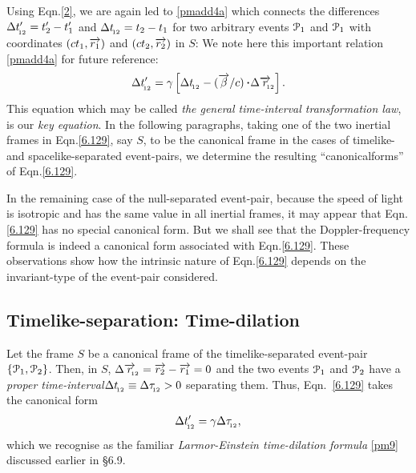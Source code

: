 Using Eqn.\eqref{2}, we are again led to 
\eqref{pmadd4a} 
which connects the differences $\Delta 
t'_{_{\hspace*{-1.5pt}{12}}}=t'_2-t'_1$  and $\Delta 
t_{_{\hspace*{-1.5pt}{12}}}=t_2-t_1$ for two arbitrary events 
$\EuScript{P}_1$ and $\EuScript{P}_1$ with coordinates 
$(ct_1,\overrightarrow{r_1})$ and $(ct_2,\overrightarrow{r_2})$ in $S$: We 
note 
here this important relation \eqref{pmadd4a} for 
future 
reference:
\begin{align} \label{6.129}
\Delta t'_\sfx{12}  =\gkg \left[\Delta
t_\sfx{12}-(\veca{\gkb}/c)\, \dotp\Delta
\veca{r}_\sfx{\nnt 12}\right].
\end{align}
This equation which may be called \textsl{the general  
time-interval transformation law}, is our \textsl{key 
equation}. In the following paragraphs, taking one of 
the 
two inertial frames in Eqn.\eqref{6.129}, say $S$, to 
be 
the 
canonical frame in the cases of timelike- and 
spacelike-separated event-pairs, we determine the 
resulting 
``canonical\break forms'' of  Eqn.\eqref{6.129}. 

In the remaining case of the null-separated 
event-pair, 
because the speed of light is isotropic and has the 
same 
value in all inertial frames, it may appear that  
Eqn.\eqref{6.129} has no special canonical form. But 
we 
shall 
see that the Doppler-frequency formula is indeed a  
canonical form associated with Eqn.\eqref{6.129}. 
These 
observations show how the intrinsic nature of  
Eqn.\eqref{6.129} 
depends on the invariant-type of the event-pair 
considered.

\subsection{Timelike-separation: Time-dilation}
Let the frame $S$ be a canonical frame of the 
timelike-separated event-pair $\{\EuScript{P}_1, 
\EuScript{P}_2 \}$. Then, in $S$, $\Delta 
\overrightarrow{r}_{_{\hspace*{-1.5pt}{\negthinspace\negthinspace 
12}}} = \overrightarrow{r_2}-\overrightarrow{r_1}=0$ and the two events 
$\EuScript{P}_1$  and $\EuScript{P}_2$ have a 
\textsl{proper 
time-interval}$ \Delta t_{_{\hspace*{-1.5pt}{12}}} \equiv \Delta 
\tau_{_{\hspace*{-1.5pt}{12}}} >0 $ separating them. Thus,  
Eqn.~\eqref{6.129} 
takes the canonical form \begin{align}\label{4} \Delta 
t'_{_{\hspace*{-1.5pt}{12}}} ={\gamma} \Delta \tau_{_{\hspace*{-1.5pt}{12}}}, \end{align} 
which 
we 
recognise as the familiar \textsl{Larmor-Einstein  
time-dilation formula} \eqref{pm9} discussed earlier 
in 
\S6.9.

